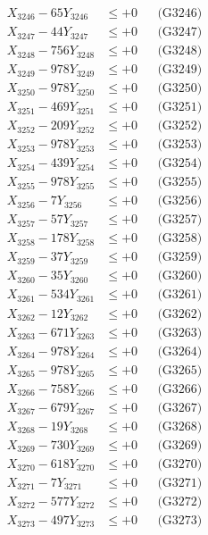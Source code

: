 \documentclass[a4paper,10pt]{article}
\begin{document}
{\begin{align}
X_{3246} - 65Y_{3246} &\leq +0 && \text{(G3246)} \\
X_{3247} - 44Y_{3247} &\leq +0 && \text{(G3247)} \\
X_{3248} - 756Y_{3248} &\leq +0 && \text{(G3248)} \\
X_{3249} - 978Y_{3249} &\leq +0 && \text{(G3249)} \\
X_{3250} - 978Y_{3250} &\leq +0 && \text{(G3250)} \\
\allowbreak
X_{3251} - 469Y_{3251} &\leq +0 && \text{(G3251)} \\
X_{3252} - 209Y_{3252} &\leq +0 && \text{(G3252)} \\
X_{3253} - 978Y_{3253} &\leq +0 && \text{(G3253)} \\
X_{3254} - 439Y_{3254} &\leq +0 && \text{(G3254)} \\
X_{3255} - 978Y_{3255} &\leq +0 && \text{(G3255)} \\
X_{3256} - 7Y_{3256} &\leq +0 && \text{(G3256)} \\
X_{3257} - 57Y_{3257} &\leq +0 && \text{(G3257)} \\
X_{3258} - 178Y_{3258} &\leq +0 && \text{(G3258)} \\
X_{3259} - 37Y_{3259} &\leq +0 && \text{(G3259)} \\
X_{3260} - 35Y_{3260} &\leq +0 && \text{(G3260)} \\
\allowbreak
X_{3261} - 534Y_{3261} &\leq +0 && \text{(G3261)} \\
X_{3262} - 12Y_{3262} &\leq +0 && \text{(G3262)} \\
X_{3263} - 671Y_{3263} &\leq +0 && \text{(G3263)} \\
X_{3264} - 978Y_{3264} &\leq +0 && \text{(G3264)} \\
X_{3265} - 978Y_{3265} &\leq +0 && \text{(G3265)} \\
X_{3266} - 758Y_{3266} &\leq +0 && \text{(G3266)} \\
X_{3267} - 679Y_{3267} &\leq +0 && \text{(G3267)} \\
X_{3268} - 19Y_{3268} &\leq +0 && \text{(G3268)} \\
X_{3269} - 730Y_{3269} &\leq +0 && \text{(G3269)} \\
X_{3270} - 618Y_{3270} &\leq +0 && \text{(G3270)} \\
\allowbreak
X_{3271} - 7Y_{3271} &\leq +0 && \text{(G3271)} \\
X_{3272} - 577Y_{3272} &\leq +0 && \text{(G3272)} \\
X_{3273} - 497Y_{3273} &\leq +0 && \text{(G3273)} \\

\end{align}}
\end{document}
